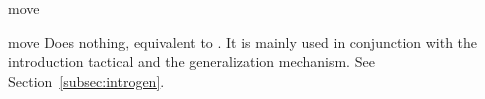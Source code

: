 \begin{tactic}[move]{move}
  \begin{tsyntax}[empty]{move}
     Does nothing, equivalent to . It is mainly
     used in conjunction with the introduction tactical and the
     generalization mechanism. See Section~\ref{subsec:introgen}.
  \end{tsyntax}
\end{tactic}
